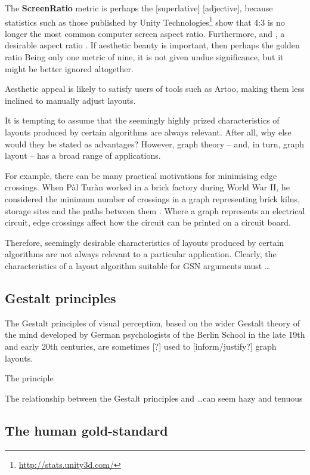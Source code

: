 The \textbf{ScreenRatio} metric is perhaps the [superlative] [adjective], because statistics such as those published by Unity Technologies\footnote{\url{http://stats.unity3d.com/}} show that 4:3 is no longer the most common computer screen aspect ratio. 
Furthermore, and , a desirable aspect ratio . If aesthetic beauty is important, then perhaps the golden ratio 
Being only one metric of nine, it is not given undue significance, but it might be better ignored altogether.

Aesthetic appeal is likely to satisfy users of tools such as Artoo, making them less inclined to manually adjust layouts.

It is tempting to assume that the seemingly highly prized characteristics of layouts produced by certain algorithms are always relevant. After all, why else would they be stated as advantages? However, graph theory -- and, in turn, graph layout -- has a broad range of applications. 

For example, there can be many practical motivations for minimising edge crossings.
When P\`{a}l Tur\`{a}n worked in a brick factory during World War II,
he considered the minimum number of crossings in a graph representing
brick kilns, storage sites and the paths between them .
Where a graph represents an electrical circuit, edge crossings affect how the circuit can be printed on a circuit board.

Therefore, seemingly desirable characteristics of layouts produced by certain algorithms are not always relevant to a particular application.
Clearly, the characteristics of a layout algorithm suitable for GSN arguments must \ldots

\subsection{Gestalt principles}


The Gestalt principles of visual perception,
based on the wider Gestalt theory of the mind developed by German psychologists of the Berlin School in the late 19th and early 20th centuries,
are sometimes [?] used to [inform/justify?] graph layouts.

The principle 

The relationship between the Gestalt principles and \ldots can seem hazy and tenuous

\subsection{The human gold-standard }

